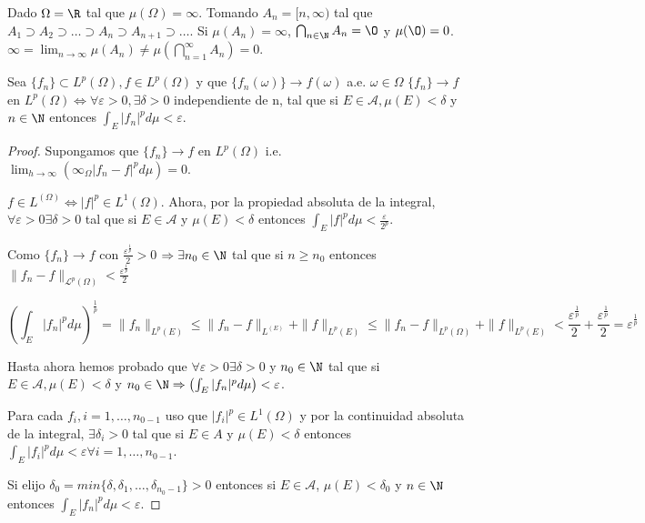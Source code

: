 
\begin{ejemplo}
  Dado $\Omega = \R$ tal que $\mu(\Omega) = \infty$. Tomando $A_n = [n,
  \infty)$ tal que $A_1 \supset A_2 \supset \hdots \supset A_n \supset
  A_{n+1} \supset \hdots$. Si $\mu(A_n) = \infty$, $\bigcap_{n\in \N} A_n =
  \O$ y $\mu(\O) = 0$. $\infty = \lim_{n \to \infty} \mu(A_n) \neq
  \mu(\bigcap_{n=1}^{\infty} A_n) = 0$.
\end{ejemplo}

\begin{nth}[Vitali]
  Sea $\{f_n\} \subset L^p(\Omega), f \in L^p(\Omega)$ y que
  $\{f_n(\omega)\} \rightarrow f(\omega)$ a.e. $\omega \in \Omega$ $\{f_n\}
  \rightarrow f$ en $L^p(\Omega) \Leftrightarrow \forall \varepsilon > 0,
  \exists \delta > 0$ independiente de n, tal que si $E \in \mathscr A, \mu(E) <
  \delta$ y $n \in \N$ entonces $\int_E |f_n|^pd\mu < \varepsilon$.
\end{nth}

\begin{proof}
   \boxed{\Rightarrow} Supongamos que $\{f_n\} \rightarrow f$ en $L^p(\Omega)$
   i.e. $\lim_{h \to \infty}(\infty_{\Omega}|f_n - f|^pd\mu) = 0$.

   $f \in L^(\Omega) \Leftrightarrow |f|^p \in L^1(\Omega)$. Ahora, por la
   propiedad absoluta de la integral, $\forall \varepsilon > 0 \exists \delta >
   0$ tal que si $E \in \mathscr A$ y $\mu(E) < \delta$ entonces $\displaystyle \int_E |f|^p d\mu < \frac{\varepsilon}{2^p}$.

   Como $\{f_n\} \rightarrow f$ con  $\frac{\varepsilon^{\frac{1}{p}}}{2} > 0$ $\Rightarrow \exists n_0 \in \N$ tal que si $n
   \geq n_0$ entonces $\|f_n - f\|_{\mathcal L^p(\Omega)} < \frac{\varepsilon^{\frac{1}{p}}}{2}$

   $$\left(\int_E |f_n|^p d\mu\right)^{\frac{1}{p}} = \|f_n\|_{ L^p(E)} \leq \|f_n -
   f\|_{ L^(E)}+ \|f\|_{ L^p(E)} \leq \|f_n - f\|_{
     L^p(\Omega)} + \|f\|_{ L^p(E)} <
   \frac{\varepsilon^{\frac{1}{p}}}{2} + \frac{\varepsilon^{\frac{1}{p}}}{2} =
   \varepsilon^{\frac{1}{p}}$$

   Hasta ahora hemos probado que $\forall \varepsilon > 0 \exists \delta > 0$ y
   $n_0 \in \N$ tal que si $E \in \mathscr A, \mu(E) <
  \delta$ y $n_0 \in \N \Rightarrow \left( \int_E|f_n|^p d\mu \right) <
  \varepsilon$.

  Para cada $f_i, i=1, \hdots, n_{0-1}$ uso que $|f_i|^p \in L^1(\Omega)$ y por
  la continuidad absoluta de la integral, $\exists \delta_i > 0$ tal que si $E
  \in A$ y $\mu(E) < \delta$ entonces $\int_E |f_i|^p d\mu < \varepsilon \forall
  i = 1, \hdots , n_{0-1}$.

  Si elijo $\delta_0 = min\{\delta, \delta_1, \hdots, \delta_{n_0 -1}\} > 0$
  entonces si $E \in \mathscr A$, $\mu(E) < \delta_0$ y $n \in \N$ entonces
  $\int_E |f_n|^p d \mu < \varepsilon$.

  \boxed{\Leftarrow}


\end{proof}

